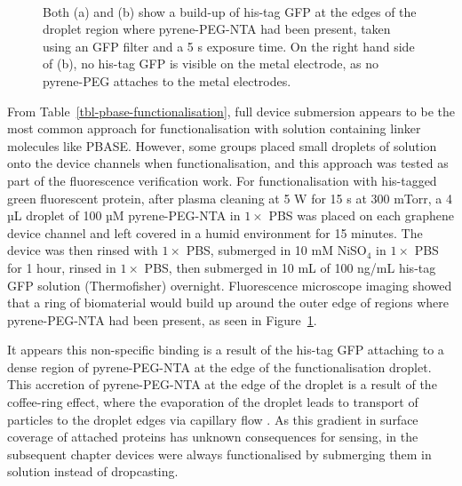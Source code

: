 \documentclass[
  a4paper,
]{scrbook}
\begin{document}
\begin{figure}
\begin{minipage}[t]{0.45\linewidth}
{{}

}

\end{minipage}%
%
\begin{minipage}[t]{0.01\linewidth}

{\centering 

~

}

\end{minipage}%

\caption{\label{fig-GFP-coffee-ring}Both (a) and (b) show a build-up of
his-tag GFP at the edges of the droplet region where pyrene-PEG-NTA had
been present, taken using an GFP filter and a 5 s exposure time. On the
right hand side of (b), no his-tag GFP is visible on the metal
electrode, as no pyrene-PEG attaches to the metal electrodes.}

\end{figure}

From Table~\ref{tbl-pbase-functionalisation}, full device submersion
appears to be the most common approach for functionalisation with
solution containing linker molecules like PBASE. However, some groups
placed small droplets of solution onto the device channels when
functionalisation, and this approach was tested as part of the
fluorescence verification work. For functionalisation with his-tagged
green fluorescent protein, after plasma cleaning at 5 W for 15 s at 300
mTorr, a 4 µL droplet of 100 µM pyrene-PEG-NTA in \(1 \times\) PBS was
placed on each graphene device channel and left covered in a humid
environment for 15 minutes. The device was then rinsed with \(1 \times\)
PBS, submerged in 10 mM NiSO\(_4\) in \(1 \times\) PBS for 1 hour,
rinsed in \(1 \times\) PBS, then submerged in 10 mL of 100 ng/mL his-tag
GFP solution (Thermofisher) overnight. Fluorescence microscope imaging
showed that a ring of biomaterial would build up around the outer edge
of regions where pyrene-PEG-NTA had been present, as seen in
Figure~\ref{fig-GFP-coffee-ring}.

It appears this non-specific binding is a result of the his-tag GFP
attaching to a dense region of pyrene-PEG-NTA at the edge of the
functionalisation droplet. This accretion of pyrene-PEG-NTA at the edge
of the droplet is a result of the coffee-ring effect, where the
evaporation of the droplet leads to transport of particles to the
droplet edges via capillary flow \autocite{Deegan1997,Shimobayashi2018}.
As this gradient in surface coverage of attached proteins has unknown
consequences for sensing, in the subsequent chapter devices were always
functionalised by submerging them in solution instead of dropcasting.
\end{document}
